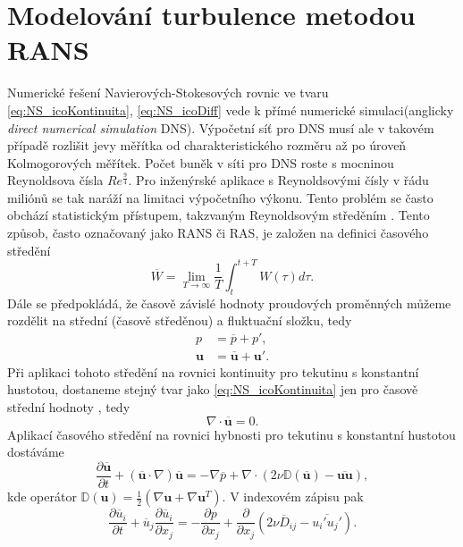 \section{Modelování turbulence metodou RANS}
Numerické řešení Navierových-Stokesových rovnic ve tvaru \ref{eq:NS_icoKontinuita}, \ref{eq:NS_icoDiff} vede k přímé numerické simulaci(anglicky \textit{direct numerical simulation} DNS). Výpočetní síť pro DNS musí ale v takovém případě rozlišit jevy měřítka od charakteristického rozměru až po úroveň Kolmogorových měřítek. Počet buněk v síti pro DNS roste s mocninou Reynoldsova čísla $ Re^{\frac{9}{4}} $. Pro inženýrské aplikace s Reynoldsovými čísly v řádu miliónů se tak naráží na limitaci výpočetního výkonu.
Tento problém se často obchází statistickým přístupem, takzvaným Reynoldsovým středěním \cite{dvorak1987vnitrniaerodynamika}. Tento způsob, často označovaný jako RANS či RAS, je založen na definici časového středění
\begin{equation}
\overline{W}=\lim\limits_{T\to\infty}\frac{1}{T}\int_{t}^{t+T}W(\tau)d\tau.
\end{equation}
Dále se předpokládá, že časově závislé hodnoty proudových proměnných můžeme rozdělit na střední (časově středěnou) a fluktuační složku, tedy
\begin{align}
p&=\overline{p}+p',\\
\mathbf{u} &= \overline{\mathbf{u}}+\mathbf{u}'.
\end{align}
Při aplikaci tohoto středění na rovnici kontinuity pro tekutinu s konstantní hustotou, dostaneme stejný tvar jako \ref{eq:NS_icoKontinuita} jen pro časově střední hodnoty \cite{dvorak1987vnitrniaerodynamika}, tedy
\begin{equation}
\nabla \cdot \overline{\mathbf{u}} = 0.
\end{equation}
Aplikací časového středění na rovnici hybnosti pro tekutinu s konstantní hustotou dostáváme \cite{dvorak1987vnitrniaerodynamika}
\begin{equation}\label{eq:RANS_hybnostVekt}
\dfrac{\partial \overline{\mathbf{u}}}{\partial t} + (\overline{\mathbf{u}}\cdot \nabla) \overline{\mathbf{u}}=-\nabla\overline{p} +\nabla \cdot (2\nu \mathbb{D} (\overline{\mathbf{u}}) - \overline{\mathbf{u}\mathbf{u}}),
\end{equation}
kde operátor $ \mathbb{D}(\mathbf{u})=\frac{1}{2}(\nabla\mathbf{u}+\nabla\mathbf{u}^T) $. V indexovém zápisu pak
\begin{equation}
\frac{\partial \overline{u}_i}{\partial t} + \overline{u}_j\dfrac{\partial \overline{u}_i}{\partial x_j} = -\dfrac{\partial p}{\partial x_j} + 
\dfrac{\partial}{\partial x_j} \left(2\nu\overline{D}_{ij}-\overline{u_i' u_j'}\right).
\end{equation}

